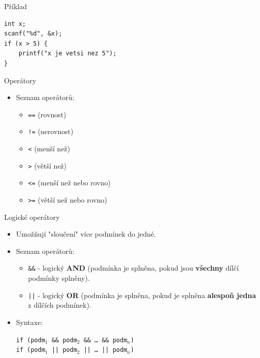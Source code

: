 \documentclass[14pt]{beamer}
\begin{document}
    \begin{frame}[t,fragile]{Příklad}
        \begin{lstlisting}
int x;
scanf("%d", &x);
if (x > 5) {
    printf("x je vetsi nez 5");
}
        \end{lstlisting}
    \end{frame}

    \begin{frame}[t]{Operátory}
        \begin{itemize}
            \item Seznam operátorů:
            \begin{itemize}
                \item \texttt{==} (rovnost)
                \item \texttt{!=} (nerovnost)
                \item \texttt{<} (menší než)
                \item \texttt{>} (větší než)
                \item \texttt{<=} (menší než nebo rovno)
                \item \texttt{>=} (větší než nebo rovno)
            \end{itemize}
        \end{itemize}
    \end{frame}

    \begin{frame}[t]{Logické operátory}
        \begin{itemize}
            \item Umožňují "sloučení" více podmínek do jedné.
            \item Seznam operátorů:
            \begin{itemize}
                \item \texttt{\&\&} - logický \textbf{AND} (podmínka je splněna, pokud jsou \textbf{všechny} dílčí podmínky splněny).
                \item \texttt{||} - logický \textbf{OR} (podmínka je splněna, pokud je splněna \textbf{alespoň jedna} z dílčích podmínek).
            \end{itemize}
            \item Syntaxe:
            \begin{center}
                \texttt{if (podm$_1$ \&\& podm$_2$ \&\& \dots{ }\&\& podm$_n$)}\\
                \texttt{if (podm$_1$ || podm$_2$ || \dots{ }|| podm$_n$)}
            \end{center}
        \end{itemize}
    \end{frame}
\end{document}
